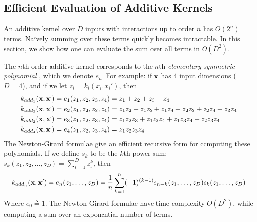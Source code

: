 
\subsection{Efficient Evaluation of Additive Kernels}
An additive kernel over $D$ inputs with interactions up to order $n$ has $O(2^n)$ terms.  Na\"{i}vely summing over these terms quickly becomes intractable.  In this section, we show how one can evaluate the sum over all terms in $O(D^2)$.

The $n$th order additive kernel corresponds to the $n$th \textit{elementary symmetric polynomial}\cite{macdonald1998symmetric} \cite{stanley2001enumerative}, which we denote $e_n$.  For example:  if $\bf x$ has 4 input dimensions ($D = 4$), and if we let $z_i = k_i(x_i,x_i')$, then
\begin{align*}
k_{add_1}({\bf x, x'}) & = e_1( z_1, z_2, z_3, z_4 ) = z_1 + z_2 + z_3 + z_4 \\
k_{add_2}({\bf x, x'}) & = e_2( z_1, z_2, z_3, z_4 ) = z_1 z_2 + z_1 z_3 + z_1z_4 + z_2 z_3 + z_2 z_4 + z_3 z_4 \\
k_{add_3}({\bf x, x'}) & = e_3( z_1, z_2, z_3, z_4 ) = z_1 z_2 z_3 + z_1 z_2 z_4 + z_1 z_3 z_4 + z_2 z_3 z_4 \\
k_{add_4}({\bf x, x'}) & = e_4( z_1, z_2, z_3, z_4 ) = z_1 z_2 z_3 z_4
\end{align*}
The Newton-Girard formulae give an efficient recursive form for computing these polynomials.  If we define $s_k$ to be the $k$th power sum:  $s_k(z_1,z_2,\dots,z_D) = \sum_{i=1}^Dz_i^k$, then
\begin{equation}
k_{add_n}({\bf x, x'}) = e_n(z_1,\dots,z_D) = \frac{1}{n} \sum_{k=1}^n (-1)^{(k-1)} e_{n-k}(z_1,\dots,z_D)s_k(z_1,\dots,z_D)
\end{equation}
Where $e_0 \triangleq 1$.  The Newton-Girard formulae have time complexity $O( D^2 )$, while computing a sum over an exponential number of terms.


